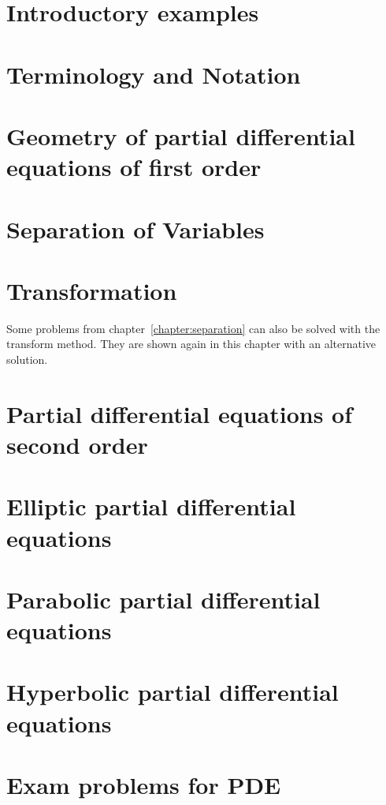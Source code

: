 \documentclass[a4paper,12pt]{book}
\begin{document}

\mainmatter


\chapter{Introductory examples}

\chapter{Terminology and Notation}

\chapter{Geometry of partial differential equations of first order
\label{chapter:separation}}

\chapter{Separation of Variables\label{chapter:separation}}

\chapter{Transformation}
Some problems from chapter~\ref{chapter:separation}
can also be solved with the transform method.
They are shown again in this chapter with an alternative solution.
\bigskip


\chapter{Partial differential equations of second order}

\chapter{Elliptic partial differential equations}

\chapter{Parabolic partial differential equations}

\chapter{Hyperbolic partial differential equations}

%
\chapter{Exam problems for PDE}

\end{document}
